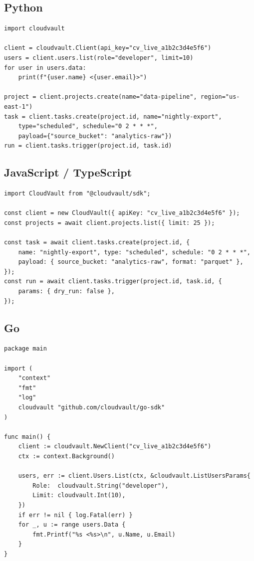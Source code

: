 \documentclass[
    language=english,
    doctype=article,
    institution=none,
]{../../omnilatex}
\begin{document}
\subsection{Python}
\begin{verbatim}
import cloudvault

client = cloudvault.Client(api_key="cv_live_a1b2c3d4e5f6")
users = client.users.list(role="developer", limit=10)
for user in users.data:
    print(f"{user.name} <{user.email}>")

project = client.projects.create(name="data-pipeline", region="us-east-1")
task = client.tasks.create(project.id, name="nightly-export",
    type="scheduled", schedule="0 2 * * *",
    payload={"source_bucket": "analytics-raw"})
run = client.tasks.trigger(project.id, task.id)
\end{verbatim}

\subsection{JavaScript / TypeScript}
\begin{verbatim}
import CloudVault from "@cloudvault/sdk";

const client = new CloudVault({ apiKey: "cv_live_a1b2c3d4e5f6" });
const projects = await client.projects.list({ limit: 25 });

const task = await client.tasks.create(project.id, {
    name: "nightly-export", type: "scheduled", schedule: "0 2 * * *",
    payload: { source_bucket: "analytics-raw", format: "parquet" },
});
const run = await client.tasks.trigger(project.id, task.id, {
    params: { dry_run: false },
});
\end{verbatim}

\subsection{Go}
\begin{verbatim}
package main

import (
    "context"
    "fmt"
    "log"
    cloudvault "github.com/cloudvault/go-sdk"
)

func main() {
    client := cloudvault.NewClient("cv_live_a1b2c3d4e5f6")
    ctx := context.Background()

    users, err := client.Users.List(ctx, &cloudvault.ListUsersParams{
        Role:  cloudvault.String("developer"),
        Limit: cloudvault.Int(10),
    })
    if err != nil { log.Fatal(err) }
    for _, u := range users.Data {
        fmt.Printf("%s <%s>\n", u.Name, u.Email)
    }
}
\end{verbatim}
\end{document}
